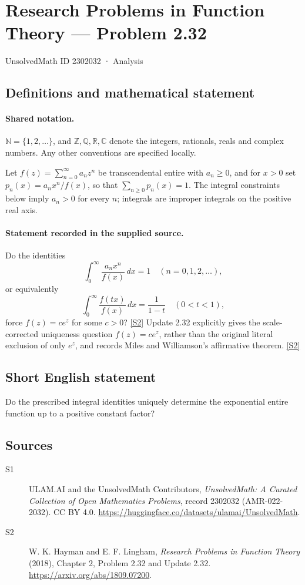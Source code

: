 \documentclass[11pt]{article}
\newcommand{\sref}[2]{\hyperlink{source:#1:#2}{[S#2]}}
\begin{document}
\setcounter{section}{2302031}
\section{Research Problems in Function Theory — Problem 2.32}\label{2302032}
{\small\sffamily UnsolvedMath ID 2302032 · Analysis}
\subsection{Definitions and mathematical statement}

\paragraph{Shared notation.}$\mathbb N=\{1,2,\ldots\}$, and $\mathbb Z,\mathbb Q,\mathbb R,\mathbb C$ denote the integers, rationals, reals and complex numbers. Any other conventions are specified locally.


Let $f(z)=\sum_{n=0}^\infty a_nz^n$ be transcendental entire with $a_n\ge0$, and for $x>0$ set $p_n(x)=a_nx^n/f(x)$, so that $\sum_{n\ge0}p_n(x)=1$.
The integral constraints below imply $a_n>0$ for every $n$; integrals are improper integrals on the positive real axis.

\paragraph{Statement recorded in the supplied source.}
Do the identities
\[\int_0^\infty \frac{a_nx^n}{f(x)}\,dx=1\quad(n=0,1,2,\ldots),\]
or equivalently
\[\int_0^\infty \frac{f(tx)}{f(x)}\,dx=\frac1{1-t}\quad(0<t<1),\]
force $f(z)=ce^z$ for some $c>0$? \sref{2302032}{2}
Update 2.32 explicitly gives the scale-corrected uniqueness question $f(z)=ce^z$, rather than the original literal exclusion of only $e^z$, and records Miles and Williamson's affirmative theorem. \sref{2302032}{2}
\subsection{Short English statement}
Do the prescribed integral identities uniquely determine the exponential entire function up to a positive constant factor?
\subsection{Sources}
\begin{description}
\item[\hypertarget{source:2302032:1}{S1}] ULAM.AI and the UnsolvedMath Contributors, \emph{UnsolvedMath: A Curated Collection of Open Mathematics Problems}, record 2302032 (AMR-022-2032). CC BY 4.0. \url{https://huggingface.co/datasets/ulamai/UnsolvedMath}.
\item[\hypertarget{source:2302032:2}{S2}] W. K. Hayman and E. F. Lingham, \emph{Research Problems in Function Theory} (2018), Chapter 2, Problem 2.32 and Update 2.32. \url{https://arxiv.org/abs/1809.07200}.
\end{description}
\label{end:2302032}
\end{document}
